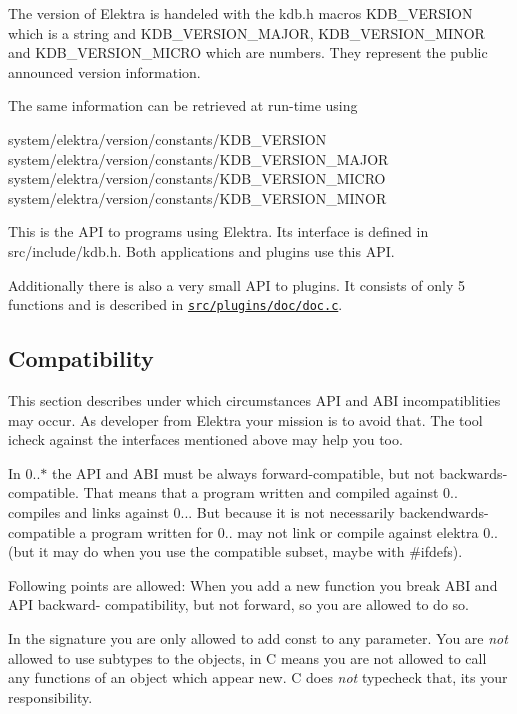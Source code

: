 The version of Elektra is handeled with the kdb.\+h macros {\ttfamily K\+D\+B\+\_\+\+V\+E\+R\+S\+I\+ON} which is a string and {\ttfamily K\+D\+B\+\_\+\+V\+E\+R\+S\+I\+O\+N\+\_\+\+M\+A\+J\+OR}, {\ttfamily K\+D\+B\+\_\+\+V\+E\+R\+S\+I\+O\+N\+\_\+\+M\+I\+N\+OR} and {\ttfamily K\+D\+B\+\_\+\+V\+E\+R\+S\+I\+O\+N\+\_\+\+M\+I\+C\+RO} which are numbers. They represent the public announced version information.

The same information can be retrieved at run-\/time using \begin{DoxyVerb}    system/elektra/version/constants/KDB_VERSION
    system/elektra/version/constants/KDB_VERSION_MAJOR
    system/elektra/version/constants/KDB_VERSION_MICRO
    system/elektra/version/constants/KDB_VERSION_MINOR
\end{DoxyVerb}


This is the A\+PI to programs using Elektra. Its interface is defined in src/include/kdb.h. Both applications and plugins use this A\+PI.

Additionally there is also a very small A\+PI to plugins. It consists of only 5 functions and is described in \href{/home/markus/Projekte/Elektra/current/src/plugins/doc/doc.c}{\tt src/plugins/doc/doc.\+c}.

\subsection*{Compatibility}

This section describes under which circumstances A\+PI and A\+BI incompatiblities may occur. As developer from Elektra your mission is to avoid that. The tool icheck against the interfaces mentioned above may help you too.

In 0..$\ast$ the A\+PI and A\+BI must be always forward-\/compatible, but not backwards-\/compatible. That means that a program written and compiled against 0.. compiles and links against 0... But because it is not necessarily backendwards-\/compatible a program written for 0.. may not link or compile against elektra 0.. (but it may do when you use the compatible subset, maybe with \#ifdefs).

Following points are allowed\+: When you add a new function you break A\+BI and A\+PI backward-\/ compatibility, but not forward, so you are allowed to do so.

In the signature you are only allowed to add const to any parameter. You are {\itshape not} allowed to use subtypes to the objects, in C means you are not allowed to call any functions of an object which appear new. C does {\itshape not} typecheck that, it\textquotesingle{}s your responsibility.

